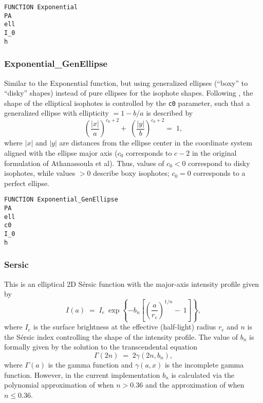 \documentclass[10pt,a4paper,article]{memoir}
\begin{document}
\begin{verbatim}
FUNCTION Exponential
PA
ell
I_0
h
\end{verbatim}


\subsubsection{Exponential\_GenEllipse}

Similar to the Exponential function, but using generalized ellipses (``boxy'' to
``disky'' shapes) instead of pure ellipses for the isophote shapes.  Following
\citet{athanassoula90}, the shape of the elliptical isophotes is controlled by
the \texttt{c0} parameter, such that a generalized ellipse with ellipticity $= 1
- b/a$ is described by
\begin{equation}
\left( \frac{|x|}{a} \right)^{c_{0} + 2} \! \! + \; \left( \frac{|y|}{b} \right)^{c_{0} + 2}  = \; 1,
\end{equation}
where $|x|$ and $|y|$ are distances from the ellipse center in the coordinate system
aligned with the ellipse major axis ($c_{0}$ corresponds to $c - 2$ in the original
formulation of Athanassoula et al).
Thus, values of $c_{0} < 0$ correspond to disky isophotes, while values $> 0$ describe boxy
isophotes; $c_{0} = 0$ corresponds to a perfect ellipse.

\begin{verbatim}
FUNCTION Exponential_GenEllipse
PA
ell
c0
I_0
h
\end{verbatim}


\subsubsection{Sersic}

This is an elliptical 2D S\'ersic function with the major-axis intensity
profile given by
\begin{equation}
I(a) \; = \; I_{e} \: \exp \left\{ -b_{n} \left[ \left( \frac{a}{r_{e}} \right)^{1/n} \! - \: 1 \right] \right\},
\end{equation}
where $I_{e}$ is the surface brightness at the effective (half-light) radius $r_{e}$
and $n$ is the S\'ersic index controlling the shape of the intensity profile. The
value of $b_{n}$ is formally given by the solution to the transcendental equation
\begin{equation}
\Gamma(2 n) \; = \; 2 \gamma(2n, b_{n}),
\end{equation}
where $\Gamma(a)$ is the gamma function and $\gamma(a, x)$ is the incomplete gamma function.
However, in the current implementation $b_{n}$ is calculated via the polynomial approximation
of \citet{ciotti99} when $n > 0.36$ and the approximation of \citet{macarthur03} when
$n \leq 0.36$.
\end{document}
